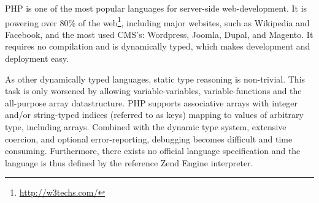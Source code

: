 PHP is one of the most popular languages for server-side web-development. It is powering over 80\% of the web\footnote{\url{http://w3techs.com/}}, including major websites, such as Wikipedia and Facebook, and the most used CMS's: Wordpress, Joomla, Dupal, and Magento. It requires no compilation and is dynamically typed, which makes development and deployment easy. 


As other dynamically typed languages, static type reasoning is non-trivial. This task is only worsened by allowing variable-variables, variable-functions and the all-purpose array datastructure. PHP supports associative arrays with integer and/or string-typed indices (referred to as keys) mapping to values of arbitrary type, including arrays. Combined with the dynamic type system, extensive coercion, and optional error-reporting, debugging becomes difficult and time consuming. Furthermore, there exists no official language specification and the language is thus defined by the reference Zend Engine interpreter.


